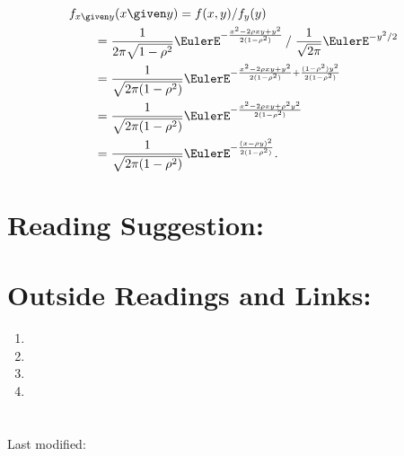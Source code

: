 \documentclass[12pt]{article}
\begin{document}
\begin{solution}
    \begin{align*}
        &f_{x \given y}(x \given y) = f(x,y)/f_y(y) \\
        &\qquad= \frac{1}{2\pi \sqrt{1 - \rho^2}} \EulerE^{- \frac{x^2 -
        2 \rho x y + y^2}{2(1-\rho^2)}} \left / \right. \frac{1}{\sqrt{2\pi}}
        \EulerE^{-y^2/2} \\
        &\qquad= \frac{1}{\sqrt{2\pi (1 - \rho^2)}} \EulerE^{- \frac{x^2
        - 2 \rho x y + y^2}{2(1-\rho^2)} + \frac{(1-\rho^2) y^2}{2(1-\rho^2)}}
        \\
        &\qquad= \frac{1}{\sqrt{2\pi (1 - \rho^2)}} \EulerE^{- \frac{x^2
        - 2 \rho x y + \rho^2 y^2}{2(1-\rho^2)} } \\
        &\qquad= \frac{1}{\sqrt{2\pi (1 - \rho^2)}} \EulerE^{- \frac{(x
        - \rho y)^2}{2(1-\rho^2)} }.
    \end{align*}
\end{solution}

\hr

\section*{Reading Suggestion:}




\hr

\section*{Outside Readings and Links:}
\begin{enumerate}
    \item
    \item
    \item
    \item
\end{enumerate}

\section*{\solutionsname} \loadSolutions

\hr

\mydisclaim \myfooter

Last modified:  \flastmod
\end{document}
